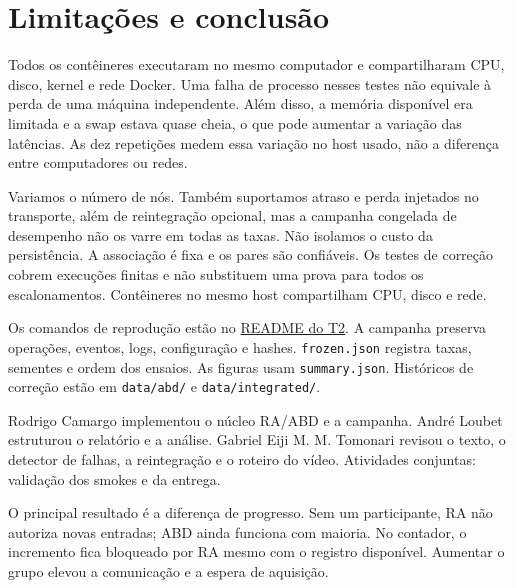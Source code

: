 \documentclass[conference]{IEEEtran}
\begin{document}
\balance
\section{Limitações e conclusão}
Todos os contêineres executaram no mesmo computador e compartilharam CPU, disco, kernel e rede Docker. Uma falha de processo nesses testes não equivale à perda de uma máquina independente. Além disso, a memória disponível era limitada e a swap estava quase cheia, o que pode aumentar a variação das latências. As dez repetições medem essa variação no host usado, não a diferença entre computadores ou redes.

Variamos o número de nós. Também suportamos atraso e perda injetados no transporte, além de reintegração opcional, mas a campanha congelada de desempenho não os varre em todas as taxas. Não isolamos o custo da persistência. A associação é fixa e os pares são confiáveis. Os testes de correção cobrem execuções finitas e não substituem uma prova para todos os escalonamentos. Contêineres no mesmo host compartilham CPU, disco e rede.

Os comandos de reprodução estão no \href{../README.md}{README do T2}. A campanha preserva operações, eventos, logs, configuração e hashes. \texttt{frozen.json} registra taxas, sementes e ordem dos ensaios. As figuras usam \texttt{summary.json}. Históricos de correção estão em \texttt{data/abd/} e \texttt{data/integrated/}.

Rodrigo Camargo implementou o núcleo RA/ABD e a campanha. André Loubet estruturou o relatório e a análise. Gabriel Eiji M. M. Tomonari revisou o texto, o detector de falhas, a reintegração e o roteiro do vídeo. Atividades conjuntas: validação dos smokes e da entrega.

O principal resultado é a diferença de progresso. Sem um participante, RA não autoriza novas entradas; ABD ainda funciona com maioria. No contador, o incremento fica bloqueado por RA mesmo com o registro disponível. Aumentar o grupo elevou a comunicação e a espera de aquisição.
\end{document}
